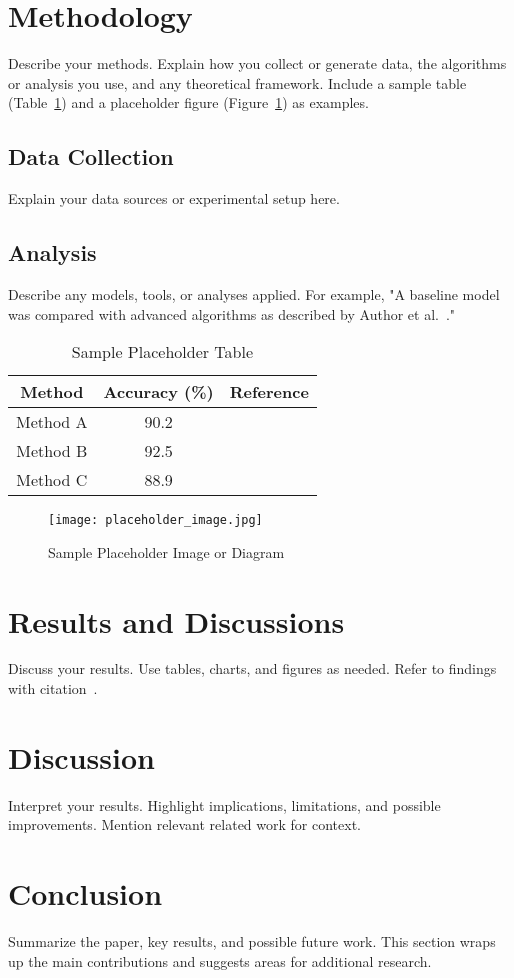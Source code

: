 \documentclass[conference]{IEEEtran}
\begin{document}
\section{Methodology}
Describe your methods. Explain how you collect or generate data, the algorithms or analysis you use, and any theoretical framework. Include a sample table (Table~\ref{tab:sampletable}) and a placeholder figure (Figure~\ref{fig:samplefig}) as examples.

\subsection{Data Collection}
Explain your data sources or experimental setup here.

\subsection{Analysis}
Describe any models, tools, or analyses applied. For example, "A baseline model was compared with advanced algorithms as described by Author et al.~\cite{b4}."

\begin{table}[htbp]
\caption{Sample Placeholder Table}
\label{tab:sampletable}
\centering
\begin{tabular}{|c|c|c|}
\hline
\textbf{Method} & \textbf{Accuracy (\%)} & \textbf{Reference} \\
\hline
Method A & 90.2 & \cite{ref4} \\
Method B & 92.5 & \cite{ref5} \\
Method C & 88.9 & \cite{ref6} \\
\hline
\end{tabular}
\end{table}

\begin{figure}[htbp]
\centering
\texttt{[image: placeholder\_image.jpg]}
\caption{Sample Placeholder Image or Diagram}
\label{fig:samplefig}
\end{figure}

\section{Results and Discussions}
Discuss your results. Use tables, charts, and figures as needed. Refer to findings with citation~\cite{b6}.

\section{Discussion}
Interpret your results. Highlight implications, limitations, and possible improvements. Mention relevant related work for context.

\section{Conclusion}
Summarize the paper, key results, and possible future work. This section wraps up the main contributions and suggests areas for additional research.




















\end{document}
